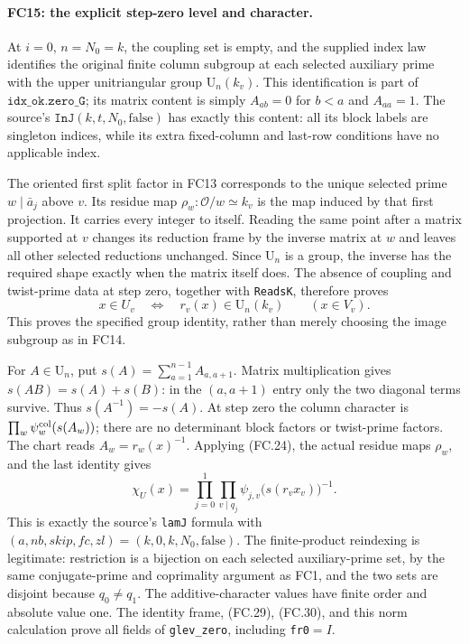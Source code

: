 \paragraph{FC15: the explicit step-zero level and character.}
At $i=0$, $n=N_0=k$, the coupling set is empty, and the supplied
index law identifies the original finite column subgroup at each
selected auxiliary prime with the upper unitriangular group
$\mathrm U_n(k_v)$. This identification is part of
$\texttt{idx\_ok.zero\_G}$; its matrix content is simply
$A_{ab}=0$ for $b<a$ and $A_{aa}=1$. The source's
$\texttt{InJ}(k,t,N_0,\mathrm{false})$ has exactly this content:
all its block labels are singleton indices, while its extra fixed-column
and last-row conditions have no applicable index.

The oriented first split factor in FC13 corresponds to the unique
selected prime $w\mid\bar a_j$ above $v$. Its residue map
$\rho_w:\mathcal O/w\simeq k_v$ is the map induced by that
first projection. It carries every integer to itself. Reading the
same point after a matrix supported at $v$ changes its reduction frame
by the inverse matrix at $w$ and leaves all other selected reductions
unchanged. Since $\mathrm U_n$ is a group, the inverse has the
required shape exactly when the matrix itself does. The absence of
coupling and twist-prime data at step zero, together with \texttt{ReadsK},
therefore proves
\[
 x\in U_v\quad\Longleftrightarrow\quad
 r_v(x)\in\mathrm U_n(k_v)\qquad(x\in V_v).          \tag{FC.29}
\]
This proves the specified group identity, rather than merely choosing
the image subgroup as in FC14.

For $A\in\mathrm U_n$, put
$s(A)=\sum_{a=1}^{n-1}A_{a,a+1}$. Matrix multiplication gives
$s(AB)=s(A)+s(B)$: in the $(a,a+1)$ entry only the two diagonal
terms survive. Thus $s(A^{-1})=-s(A)$.
At step zero the column character is
$\prod_w\psi_w^{\rm col}(s(A_w))$; there are no determinant
block factors or twist-prime factors. The chart reads
$A_w=r_w(x)^{-1}$. Applying (FC.24), the actual residue maps
$\rho_w$, and the last identity gives
\[
 \chi_U(x)=\prod_{j=0}^1\prod_{v\mid q_j}
               \psi_{j,v}\bigl(s(r_vx_v)\bigr)^{-1}. \tag{FC.30}
\]
This is exactly the source's \texttt{lamJ} formula with
$(a,nb,skip,fc,zl)=(k,0,k,N_0,\mathrm{false})$.
The finite-product reindexing is legitimate: restriction is a bijection
on each selected auxiliary-prime set, by the same conjugate-prime and
coprimality argument as FC1, and the two sets are disjoint because
$q_0\ne q_1$. The additive-character values have finite order and
absolute value one. The identity frame, (FC.29), (FC.30), and this norm
calculation prove all fields of \texttt{glev\_zero}, including
\texttt{fr0}$=I$.

